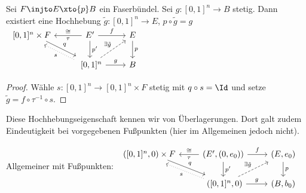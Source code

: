 \begin{kor}
    Sei $F \injto E \xto{p} B$ ein Faserbündel.
    Sei $g: [0,1]^n \to B$ stetig.
    Dann existiert eine Hochhebung $\tilde g: [0,1]^n \to E$, $p \circ \tilde g = g$
    \begin{math}
        \begin{tikzcd}~
            [0,1]^n \times F \ar[rd,"q",shift left] & E' \ar[l,"\tau","\homeomorphic"'] \ar[r,"f"] \ar[d,"p'"] & E \ar[d,"p"] \\
            &~[0,1]^n \ar[r,"g"] \ar[ru,"\exists \tilde g",dashed] \ar[ul,"s",dotted,shift left] & B
        \end{tikzcd}
    \end{math}
    \begin{proof}
        Wähle $s: [0,1]^n \to [0,1]^n \times F$ stetig mit $q \circ s = \id$ und setze $\tilde g = f \circ \tau^{-1} \circ s$.
    \end{proof}
    \begin{note}
        Diese Hochhebungseigenschaft kennen wir von Überlagerungen.
        Dort galt zudem Eindeutigkeit bei vorgegebenen Fußpunkten (hier im Allgemeinen jedoch nicht).

        Allgemeiner mit Fußpunkten:
        \begin{math}
            \begin{tikzcd}~
                ([0,1]^n,0) \times F \ar[rd,"q",shift left] & (E',(0,e_0)) \ar[l,"\tau","\homeomorphic"'] \ar[r,"f"] \ar[d,"p'"] & (E,e_0) \ar[d,"p"] \\
                &~([0,1]^n,0) \ar[r,"g"] \ar[ru,"\exists \tilde g",dashed] \ar[ul,"s",dotted,shift left] & (B,b_0)
            \end{tikzcd}
        \end{math}
    \end{note}
\end{kor}

